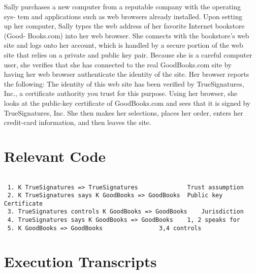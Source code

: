 \documentclass{report}
\begin{document}
 Sally purchases a new computer from a reputable company with the
 operating sys- tem and applications such as web browsers already
 installed.  Upon setting up her computer, Sally types the web address
 of her favorite Internet bookstore (Good- Books.com) into her web
 browser.  She connects with the bookstore’s web site and logs onto
 her account, which is handled by a secure portion of the web site
 that relies on a private and public key pair. Because she is a
 careful computer user, she verifies that she has connected to the
 real GoodBooks.com site by having her web browser authenticate the
 identity of the site. Her browser reports the following: The identity
 of this web site has been verified by TrueSignatures, Inc., a
 certificate authority you trust for this purpose.  Using her browser,
 she looks at the public-key certificate of GoodBooks.com and sees
 that it is signed by TrueSignatures, Inc.  She then makes her
 selections, places her order, enters her credit-card information, and
 then leaves the site.

\section{Relevant Code}
\label{sec:relevant-code-1}

\lstset{frameround=tttt}
\begin{lstlisting}[frame=tRBL]

 1. K TrueSignatures => TrueSignatures	 	        Trust assumption
 2. K TrueSignatures says K GoodBooks => GoodBooks	Public key Certificate
 3. TrueSignatures controls K GoodBooks => GoodBooks	Jurisdiction
 4. TrueSignatures says K GoodBooks => GoodBooks	1, 2 speaks for
 5. K GoodBooks	=> GoodBooks				3,4 controls

\end{lstlisting}



\section{Execution Transcripts}
\label{sec:exec-transcr-1}
\end{document}

